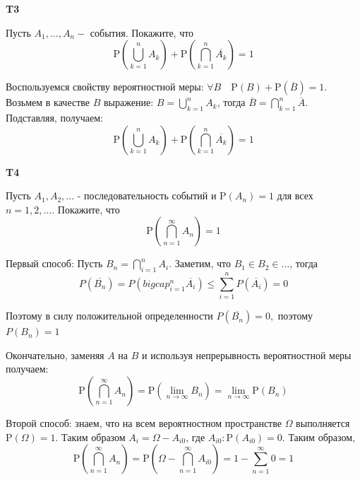 \documentclass[a4paper,12pt]{article} %
\begin{document}
\begin{example}\textbf{T3}

Пусть $A_{1}, \ldots, A_{n}-$ события. Покажите, что
$$
\mathrm{P}\left(\bigcup_{k=1}^{n} A_{k}\right)+\mathrm{P}\left(\bigcap_{k=1}^{n} \overline{A_{k}}\right)=1
$$

Воспользуемся свойству вероятностной меры: $\forall B \quad \mathrm{P}(B)+\mathrm{P}(\overline{B})=1$. 
Возьмем в качестве $B$ выражение: $B=\bigcup_{k=1}^n A_k$, тогда 
$\overline{B}=\bigcap_{k=1}^n\overline{A}$.
Подставляя, получаем:
$$
\mathrm{P}\left(\bigcup_{k=1}^{n} A_{k}\right)+\mathrm{P}\left(\bigcap_{k=1}^{n} \overline{A_{k}}\right)=1
$$


\end{example}




\begin{example}\textbf{T4}

Пусть $A_{1}, A_{2}, \ldots$ - последовательность событий и $\mathrm{P}\left(A_{n}\right)=1$ для всех $n=1,2, \ldots .$ Покажите, что
$$
\mathrm{P}\left(\bigcap_{n=1}^{\infty} A_{n}\right)=1
$$


Первый способ:
Пусть $B_n= \bigcap_{i=1}^{n} A_{i} $. Заметим, что $ B_1\in B_2 \in \ldots$, тогда 
\[ P(\overline{B_n})=P(bigcap_{i=1}^{n}\overline{ A_{i}}) \le \sum_{i=1}^{n} P(\overline{A_i})=0 \]

Поэтому в силу положительной определенности $ P(\overline{B_n})=0,$ поэтому $ P(B_n)=1 $

Окончательно, заменяя $A$ на $B$ и используя непрерывность вероятностной меры получаем:
$$
\mathrm{P}\left(\bigcap_{n=1}^{\infty} A_{n}\right)=
\mathrm{P}\left(\lim\limits_{n\rightarrow\infty} B_{n}\right)=
\lim\limits_{n\rightarrow\infty} \mathrm{P} (B_{n})
$$






Второй способ: знаем, что на всем вероятностном пространстве $\Omega$ выполняется $\mathrm{P}(\Omega)=1.$ 
Таким образом $A_i=\Omega-A_{i0}$, где $ A_{i0}: \mathrm{P}(A_{i0})=0$.
Таким образом, 
$$
\mathrm{P}\left(\bigcap_{n=1}^{\infty} A_{n}\right)=
\mathrm{P}\left(\Omega-\bigcap_{n=1}^{\infty} A_{i0}\right)=
1-\sum_{n=1}^{\infty} 0=1
$$








\end{example}
\end{document}
